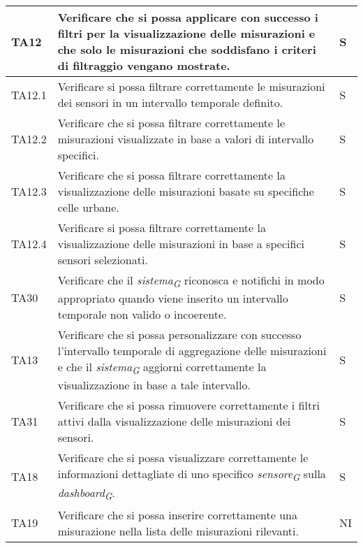 \begin{longtable}{|C{1.9cm}|L{5cm}|C{2cm}|}
    TA12 & Verificare che si possa applicare con successo i filtri per la visualizzazione delle misurazioni e che solo le misurazioni che soddisfano i criteri di filtraggio vengano mostrate. & S \\
    \hline
    
    TA12.1 & Verificare si possa filtrare correttamente le misurazioni dei sensori in un intervallo temporale definito. & S \\
    \hline
    
    TA12.2 & Verificare che si possa filtrare correttamente le misurazioni visualizzate in base a valori di intervallo specifici. & S \\
    \hline
    
    TA12.3 & Verificare che si possa filtrare correttamente la visualizzazione delle misurazioni basate su specifiche celle urbane. & S \\
    \hline
    
    TA12.4 & Verificare si possa filtrare correttamente la visualizzazione delle misurazioni in base a specifici sensori selezionati. & S \\
    \hline
    
    TA30 & Verificare che il \textit{sistema}\textsubscript{\textit{G}} riconosca e notifichi in modo appropriato quando viene inserito un intervallo temporale non valido o incoerente. & S \\
    \hline
    
    TA13 & Verificare che si possa personalizzare con successo l'intervallo temporale di aggregazione delle misurazioni e che il \textit{sistema}\textsubscript{\textit{G}} aggiorni correttamente la visualizzazione in base a tale intervallo. & S \\
    \hline
    
    TA31 & Verificare che si possa rimuovere correttamente i filtri attivi dalla visualizzazione delle misurazioni dei sensori. & S \\
    \hline
    
    TA18 & Verificare che si possa visualizzare correttamente le informazioni dettagliate di uno specifico \textit{sensore}\textsubscript{\textit{G}} sulla \textit{dashboard}\textsubscript{\textit{G}}. & S \\
    \hline
    
    TA19 & Verificare che si possa inserire correttamente una misurazione nella lista delle misurazioni rilevanti. & NI \\
    \hline
    

\end{longtable}
